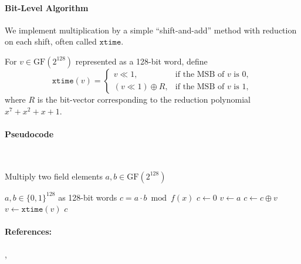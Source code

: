 \paragraph{Bit-Level Algorithm}
We implement multiplication by a simple “shift-and-add” method with reduction on each
shift, often called \(\mathtt{xtime}\).

\begin{definition}
	For \(v\in\mathrm{GF}(2^{128})\) represented as a 128-bit word, define
	\[
	\mathtt{xtime}(v) = 
	\begin{cases}
		v \ll 1, &\text{if the MSB of }v\text{ is }0,\\[6pt]
		(v \ll 1)\oplus R, &\text{if the MSB of }v\text{ is }1,
	\end{cases}
	\]
	where \(R\) is the bit-vector corresponding to the reduction polynomial
	\(x^7+x^2+x+1\).
\end{definition}

\paragraph{Pseudocode}
\ \\ \begin{algorithm}[H]
	\caption{Multiply two field elements \(a,b\in\mathrm{GF}(2^{128})\)}
	\label{alg:mul2}
	\begin{algorithmic}[1]
		\REQUIRE \(a,b\in\{0,1\}^{128}\) as 128-bit words  
		\ENSURE \(c = a\cdot b \bmod f(x)\)
		\STATE \(c \leftarrow 0\)  
		\STATE \(v \leftarrow a\)  
		\STATE \(c \leftarrow c \oplus v\)  
		\ENDIF  
		\STATE \(v \leftarrow \mathtt{xtime}(v)\)  
		\ENDFOR  
		\RETURN \(c\)
	\end{algorithmic}
\end{algorithm}



\paragraph{References:} 
\cite{NIST80038d},\;
\cite{McGrewViega2004gcm}